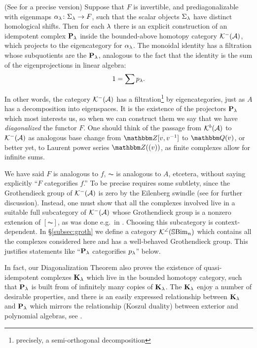 \begin{theorem} \label{thm:DiagThmIntro} (See \cite[Theorem 1.22]{ElHog17a} for a precise version) Suppose that $F$ is invertible, and prediagonalizable with eigenmaps $\alpha_\lambda \colon \Sigma_\lambda \rightarrow F$, such
that the scalar objects $\Sigma_\lambda$ have distinct homological shifts. Then for each $\lambda$ there is an explicit construction of an idempotent complex ${\mathbf P}_\lambda$ inside the
bounded-above homotopy category ${\mathcal{K}}^-({\mathcal{A}})$, which projects to the eigencategory for $\alpha_\lambda$. The monoidal identity has a filtration whose subquotients are the ${\mathbf P}_\lambda$, analogous to the
fact that the identity is the sum of the eigenprojections in linear algebra: \[1 = \sum p_\lambda.\] \end{theorem}

In other words, the category ${\mathcal{K}}^-({\mathcal{A}})$ has a filtration\footnote{precisely, a semi-orthogonal decomposition} by eigencategories, just as $A$ has a decomposition into eigenspaces. It is the existence of the projectors ${\mathbf P}_\lambda$ which most
interests us, so when we can construct them we say that we have \emph{diagonalized} the functor $F$. One should think of the passage from ${\mathcal{K}}^b({\mathcal{A}})$ to ${\mathcal{K}}^-({\mathcal{A}})$ as analogous base change from $\Z[v,v\inv]$ to $\Q(v)$, or better yet, to Laurent power series $\Z((v))$, as finite complexes allow for infinite sums.


\begin{remark} We have said $F$ is analogous to $f$, $\AC$ is analogous to $A$, etcetera, without saying explicitly ``$F$ categorifies $f$.'' To be precise requires some subtlety, since
the Grothendieck group of ${\mathcal{K}}^-({\mathcal{A}})$ is zero by the Eilenberg swindle (see \cite[Remark 4.9]{ElHog17a} for further discussion). Instead, one must show that all the complexes involved
live in a suitable full subcategory of ${\mathcal{K}}^-({\mathcal{A}})$ whose Grothendieck group is a nonzero extension of $[\AC]$, as was done e.g.~in \cite{CK12a,AchStr}. Choosing this subcategory is context-dependent.  In \S \ref{subsec:groth} we define a category ${\mathcal{K}}^{\angle}({\mathbb{S}}{\rm Bim }_n)$ which contains all the complexes considered here and has a well-behaved Grothendieck group.  This justifies statements like ``${\mathbf P}_\lambda$ categorifies $p_\lambda$'' below.
\end{remark}

\begin{remark} In fact, our Diagonalization Theorem also proves the existence of quasi-idempotent complexes ${\mathbf K}_\lambda$ which live in the bounded homotopy category, such that ${\mathbf P}_\lambda$ is built from of infinitely many copies of ${\mathbf K}_\lambda$. The ${\mathbf K}_\lambda$ enjoy a number of desirable properties, and there is an easily expressed relationship between ${\mathbf K}_\lambda$ and ${\mathbf P}_\lambda$ which mirrors the relationship (Koszul duality) between exterior and polynomial algebras, see \cite[\S 7.3]{ElHog17a}. \end{remark}

